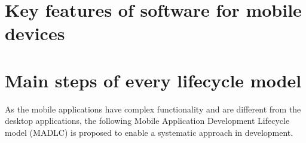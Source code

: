 \documentclass[10pt,slovak,a4paper]{article}
\begin{document}

\section{Key features of software for mobile devices}

\section{Main steps of every lifecycle model} %
As the mobile applications have complex functionality and are different from the desktop applications, the following Mobile Application Development Lifecycle model (MADLC) is proposed to enable a systematic approach in development.
\end{document}
